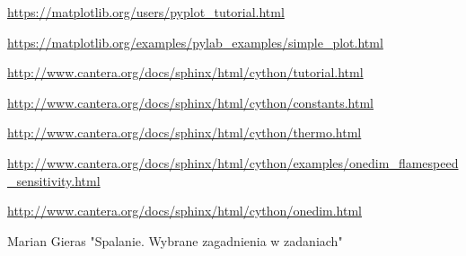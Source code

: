\documentclass[a4paper]{article}
\begin{document}
\url{https://matplotlib.org/users/pyplot_tutorial.html}

\url{https://matplotlib.org/examples/pylab_examples/simple_plot.html}

\url{http://www.cantera.org/docs/sphinx/html/cython/tutorial.html}

\url{http://www.cantera.org/docs/sphinx/html/cython/constants.html}

\url{http://www.cantera.org/docs/sphinx/html/cython/thermo.html}

\url{http://www.cantera.org/docs/sphinx/html/cython/examples/onedim_flamespeed_sensitivity.html}

\url{http://www.cantera.org/docs/sphinx/html/cython/onedim.html}

Marian Gieras "Spalanie. Wybrane zagadnienia w zadaniach"
\end{document}

